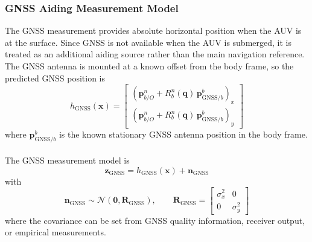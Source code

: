 \subsubsection{GNSS Aiding Measurement Model}
The GNSS measurement provides absolute horizontal position when the AUV is at the surface. Since GNSS is not available when the AUV is submerged, it is treated as an additional aiding source rather than the main navigation reference. The GNSS antenna is mounted at a known offset from the body frame, so the predicted GNSS position is
\begin{equation}
    h_{\text{GNSS}}(\mathbf{x}) =
    \begin{bmatrix}
        \left(\mathbf{p}_{b/O}^{n} + R_b^n(\mathbf{q})\,\mathbf{p}_{\text{GNSS}/b}^{b}\right)_x \\
        \left(\mathbf{p}_{b/O}^{n} + R_b^n(\mathbf{q})\,\mathbf{p}_{\text{GNSS}/b}^{b}\right)_y
    \end{bmatrix}
    \label{eq:aiding-measurement-model-gnss}
\end{equation}
where $\mathbf{p}_{\text{GNSS}/b}^{b}$ is the known stationary GNSS antenna position in the body frame.
\\ \\
The GNSS measurement model is
$$
    \mathbf{z}_{\text{GNSS}} = h_{\text{GNSS}}(\mathbf{x}) + \mathbf{n}_{\text{GNSS}}
$$
with
\begin{equation}
    \mathbf{n}_{\text{GNSS}} \sim \mathcal{N}(\mathbf{0}, \mathbf{R}_{\text{GNSS}}),
    \qquad
    \mathbf{R}_{\text{GNSS}} =
    \begin{bmatrix}
        \sigma_x^2 & 0 \\
        0 & \sigma_y^2
    \end{bmatrix}
    \label{eq:aiding-measurement-model-gnss-noise}
\end{equation}
where the covariance can be set from GNSS quality information, receiver output, or empirical measurements.



